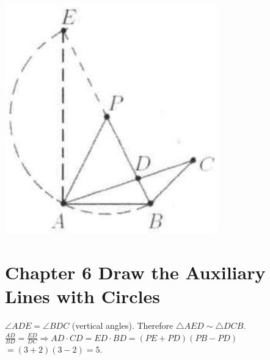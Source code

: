\documentclass[10pt]{article}
\begin{document}
\includegraphics[max width=\textwidth, center]{2025_04_17_97bc1f7e44d93c271a88g-211}

\section*{Chapter 6 Draw the Auxiliary Lines with Circles}
\(\angle A D E=\angle B D C\) (vertical angles). Therefore \(\triangle A E D \sim \triangle D C B\).\\
\(\frac{A D}{B D}=\frac{E D}{D C} \Rightarrow A D \cdot C D=E D \cdot B D=(P E+P D)(P B-P D)\)\\
\(=(3+2)(3-2)=5\).
\end{document}

